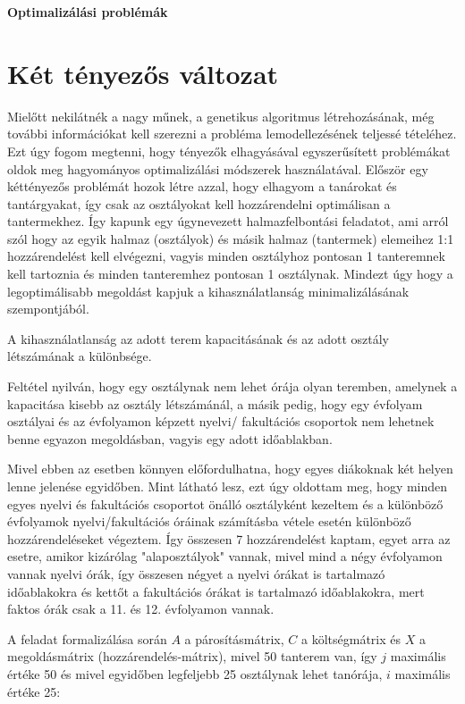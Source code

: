 \documentclass[a4paper,12pt]{article}
\begin{document}
\begin{center}
    \huge \textbf{Optimalizálási problémák} 
\end{center}

\section{Két tényezős változat}

Mielőtt nekilátnék a nagy műnek, a genetikus algoritmus létrehozásának, még további
információkat kell szerezni a probléma lemodellezésének teljessé tételéhez. Ezt úgy fogom
megtenni, hogy tényezők elhagyásával egyszerűsített problémákat oldok meg hagyományos
optimalizálási módszerek használatával. Először egy kéttényezős problémát hozok létre azzal,
hogy elhagyom a tanárokat és tantárgyakat, így csak az osztályokat kell hozzárendelni
optimálisan a tantermekhez. Így kapunk egy úgynevezett halmazfelbontási feladatot, ami arról
szól hogy az egyik halmaz (osztályok) és másik halmaz (tantermek) elemeihez 1:1
hozzárendelést kell elvégezni, vagyis minden osztályhoz pontosan 1 tanteremnek kell tartoznia
és minden tanteremhez pontosan 1 osztálynak.
Mindezt úgy hogy a legoptimálisabb megoldást
kapjuk a kihasználatlanság minimalizálásának szempontjából.

A kihasználatlanság az adott
terem kapacitásának és az adott osztály létszámának a különbsége.

Feltétel nyilván, hogy egy
osztálynak nem lehet órája olyan teremben, amelynek a kapacitása kisebb az osztály
létszámánál, a másik pedig, hogy egy évfolyam osztályai és az évfolyamon képzett nyelvi/
fakultációs csoportok nem lehetnek benne egyazon megoldásban, vagyis egy adott időablakban.

Mivel ebben az esetben könnyen előfordulhatna, hogy egyes diákoknak két helyen lenne jelenése
egyidőben. Mint látható lesz, ezt úgy oldottam meg, hogy minden egyes nyelvi és fakultációs
csoportot önálló osztályként kezeltem és a különböző évfolyamok nyelvi/fakultációs óráinak
számításba vétele esetén különböző hozzárendeléseket végeztem. Így összesen 7 hozzárendelést
kaptam, egyet arra az esetre, amikor kizárólag "alaposztályok" vannak, mivel mind a négy
évfolyamon vannak nyelvi órák, így összesen négyet a nyelvi órákat is tartalmazó
időablakokra és kettőt a fakultációs órákat is tartalmazó időablakokra, mert faktos órák
csak a 11. és 12. évfolyamon vannak. 

A feladat formalizálása során $A$ a párosításmátrix, $C$ a költségmátrix és $X$ a 
megoldásmátrix (hozzárendelés-mátrix), mivel 50 tanterem van, így $j$ maximális értéke 50 és
mivel egyidőben legfeljebb 25 osztálynak lehet tanórája, $i$ maximális értéke 25:
\end{document}
